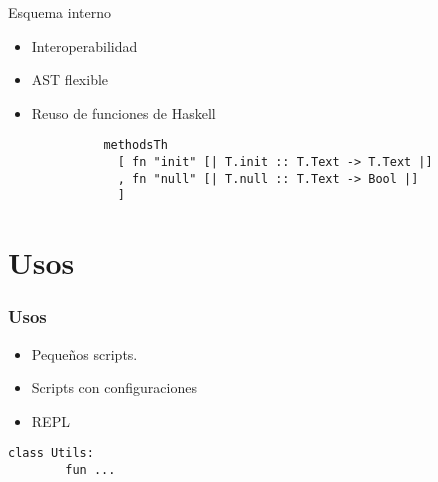 \begin{frame}
  \framebreak{}
  \begin{center}
    Esquema interno
    \begin{itemize}
      \item Interoperabilidad

      \item AST flexible
      \item Reuso de funciones de Haskell
        \begin{verbatim}
          methodsTh
            [ fn "init" [| T.init :: T.Text -> T.Text |]
            , fn "null" [| T.null :: T.Text -> Bool |]
            ]
        \end{verbatim}
    \end{itemize}
  \end{center}
\end{frame}


\section{Usos}
\begin{frame}
  \frametitle{Usos}
  \begin{center}
    \begin{itemize}
      \item Pequeños scripts.
      \item Scripts con configuraciones
      \item REPL
    \end{itemize}
  \end{center}
  \framebreak{}
  \begin{center}
    \begin{lstlisting}[language=scriptflow]
      class Utils:
        fun ...
    \end{lstlisting}
  \end{center}

\end{frame}

